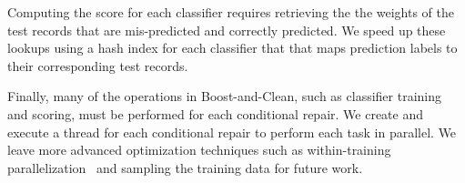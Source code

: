  Computing the score for each classifier requires retrieving the the weights of the test records that are mis-predicted and correctly predicted.  We speed up these lookups using a hash index for each classifier that that maps prediction labels to their corresponding test records.

  Finally, many of the operations in Boost-and-Clean, such as classifier training and scoring, must be performed for each conditional repair.  We create and execute a thread for each conditional repair to perform each task in parallel.  We leave more advanced optimization techniques such as within-training parallelization~\cite{recht2011hogwild} and sampling the training data for future work.